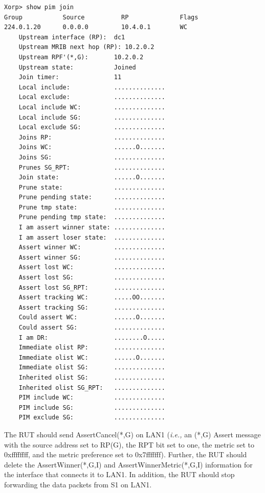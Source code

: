 \documentclass[11pt]{report}
\newcommand{\ie}{\emph{i.e.,}\xspace}
\begin{document}
\begin{itemize}
\begin{verbatim}
Xorp> show pim join 
Group           Source          RP              Flags
224.0.1.20      0.0.0.0         10.4.0.1        WC   
    Upstream interface (RP):  dc1
    Upstream MRIB next hop (RP): 10.2.0.2
    Upstream RPF'(*,G):       10.2.0.2
    Upstream state:           Joined 
    Join timer:               11
    Local include:            ..............
    Local exclude:            ..............
    Local include WC:         ..............
    Local include SG:         ..............
    Local exclude SG:         ..............
    Joins RP:                 ..............
    Joins WC:                 ......O.......
    Joins SG:                 ..............
    Prunes SG_RPT:            ..............
    Join state:               ......O.......
    Prune state:              ..............
    Prune pending state:      ..............
    Prune tmp state:          ..............
    Prune pending tmp state:  ..............
    I am assert winner state: ..............
    I am assert loser state:  ..............
    Assert winner WC:         ..............
    Assert winner SG:         ..............
    Assert lost WC:           ..............
    Assert lost SG:           ..............
    Assert lost SG_RPT:       ..............
    Assert tracking WC:       .....OO.......
    Assert tracking SG:       ..............
    Could assert WC:          ......O.......
    Could assert SG:          ..............
    I am DR:                  ........O.....
    Immediate olist RP:       ..............
    Immediate olist WC:       ......O.......
    Immediate olist SG:       ..............
    Inherited olist SG:       ..............
    Inherited olist SG_RPT:   ..............
    PIM include WC:           ..............
    PIM include SG:           ..............
    PIM exclude SG:           ..............
\end{verbatim}

  The RUT should send AssertCancel(*,G) on LAN1 (\ie an (*,G) Assert message
  with the source address set to RP(G), the RPT bit set to one, the metric set
  to 0xffffffff, and the metric preference set to 0x7fffffff).
  Further, the RUT should delete the AssertWinner(*,G,I) and
  AssertWinnerMetric(*,G,I) information for the interface that connects it to
  LAN1.
  In addition, the RUT should stop forwarding the data packets from S1 on LAN1.

\end{itemize}

\end{document}
